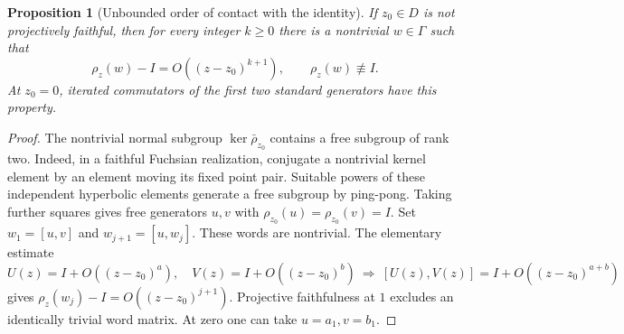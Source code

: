 \documentclass[11pt,letterpaper]{amsart}
\newtheorem{proposition}[theorem]{Proposition}
\theoremstyle{definition}
\theoremstyle{remark}
\numberwithin{equation}{section}
\begin{document}
\begin{proposition}[Unbounded order of contact with the identity]
\label{prop:unbounded-contact}
If $z_0\in D$ is not projectively faithful, then for every integer
$k\ge0$ there is a nontrivial $w\in\Gamma$ such that
\[
 \rho_z(w)-I=O((z-z_0)^{k+1}),
 \qquad \rho_z(w)\not\equiv I.
\]
At $z_0=0$, iterated commutators of the first two standard generators
have this property.
\end{proposition}
\begin{proof}
The nontrivial normal subgroup $\ker\bar\rho_{z_0}$ contains a
free subgroup of rank two. Indeed, in a faithful Fuchsian realization,
conjugate a nontrivial kernel element by an element moving its fixed
point pair. Suitable powers of these independent hyperbolic elements
generate a free subgroup by ping-pong. Taking further squares gives
free generators $u,v$ with $\rho_{z_0}(u)=\rho_{z_0}(v)=I$.
Set $w_1=[u,v]$ and $w_{j+1}=[u,w_j]$. These words are nontrivial.
The elementary estimate
\[
 U(z)=I+O((z-z_0)^a),\quad V(z)=I+O((z-z_0)^b)
 \ \Longrightarrow\ [U(z),V(z)]=I+O((z-z_0)^{a+b})
\]
gives $\rho_z(w_j)-I=O((z-z_0)^{j+1})$.
Projective faithfulness at $1$ excludes an identically trivial word
matrix. At zero one can take $u=a_1,v=b_1$.
\end{proof}
\end{document}
